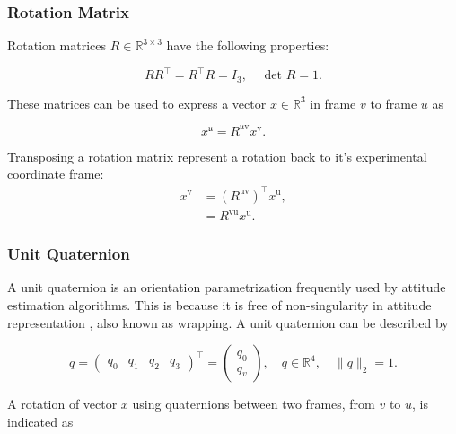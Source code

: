 \subsubsection{Rotation Matrix}
Rotation matrices $R \in \mathbb{R}^{3 \times 3}$ have the following properties:

\begin{equation}
	\label{eq:rot_mat_properties}
	R R^{\top}=R^{\top} R=I_{3}, \quad \text { det } R=1.
\end{equation}

These matrices can be used to express a vector $x \in \mathbb{R}^{3}$ in frame $v$ to frame $u$ as 

\begin{equation}
	\label{eq:rot_mat_rot_x}
	x^{\mathfrak{u}}=R^{\mathfrak{u} \mathrm{v}} x^{\mathrm{v}}.
\end{equation}

Transposing a rotation matrix represent a rotation back to it's experimental coordinate frame:
\begin{subequations}
	\begin{align}
		\label{eq:rot_mat_trans}
		x^{\mathrm{v}}&=\left(R^{\mathrm{uv}}\right)^{\top} x^{\mathrm{u}},\\
		&=R^{\mathrm{vu}} x^{\mathrm{u}}.
	\end{align}
\end{subequations}

\subsubsection{Unit Quaternion}
A unit quaternion is an orientation parametrization frequently used by attitude estimation algorithms. This is because it is free of non-singularity in attitude representation \cite{Hashim2019}, also known as wrapping. A unit quaternion can be described by

\begin{equation}
	\label{eq:unit_quarternion}
	q=\left(\begin{array}{llll}{q_{0}} & {q_{1}} & {q_{2}} & {q_{3}}\end{array}\right)^{\top}
	=\left(\begin{array}{l}{q_{0}} \\ {q_{v}}\end{array}\right), 
	\quad q \in \mathbb{R}^{4}, 
	\quad\|q\|_{2}=1.
\end{equation}

A rotation of vector $x$ using quaternions between two frames, from $v$ to $u$, is indicated as

